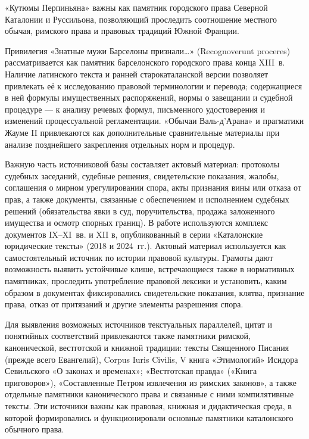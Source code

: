 «Кутюмы Перпиньяна» важны как памятник городского права Северной Каталонии и Руссильона, позволяющий проследить соотношение местного обычая, римского права и правовых традиций Южной Франции.

Привилегия «Знатные мужи Барселоны признали…» (Recognoverunt proceres) рассматривается как памятник барселонского городского права конца XIII~в. Наличие латинского текста и ранней старокаталанской версии позволяет привлекать её к исследованию правовой терминологии и перевода; содержащиеся в ней формулы имущественных распоряжений, нормы о завещании и судебной процедуре --- к анализу речевых формул, письменного удостоверения и изменений процессуальной регламентации. «Обычаи Валь-д’Арана» и прагматики Жауме II привлекаются как дополнительные сравнительные материалы при анализе позднейшего закрепления отдельных норм и процедур.

Важную часть источниковой базы составляет актовый материал: протоколы судебных заседаний, судебные решения, свидетельские показания, жалобы, соглашения о мирном урегулировании спора, акты признания вины или отказа от прав, а также документы, связанные с обеспечением и исполнением судебных решений (обязательства явки в суд, поручительства, продажа заложенного имущества и осмотр спорных границ). В работе используются комплекс документов IX--XI~вв. и XII в, опубликованный в серии «Каталонские юридические тексты» (2018 и 2024~гг.). Актовый материал используется как самостоятельный источник по истории правовой культуры. Грамоты дают возможность выявить устойчивые клише, встречающиеся также в нормативных памятниках, проследить употребление правовой лексики и установить, каким образом в документах фиксировались свидетельские показания, клятва, признание права, отказ от притязаний и другие элементы разрешения спора.

Для выявления возможных источников текстуальных параллелей, цитат и понятийных соответствий привлекаются также памятники римской, канонической, вестготской и книжной традиции: тексты Священного Писания (прежде всего Евангелий), Corpus Iuris Civilis, V книга «Этимологий» Исидора Севильского «О законах и временах»; «Вестготская правда» («Книга приговоров»), «Составленные Петром извлечения из римских законов», а также отдельные памятники канонического права и связанные с ними компилятивные тексты. Эти источники важны как правовая, книжная и дидактическая среда, в которой формировались и функционировали основные памятники каталонского обычного права.

